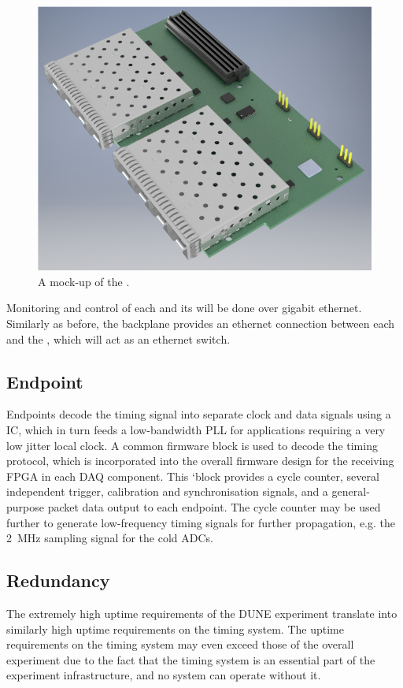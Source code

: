 \documentclass{article}
\begin{document}
\begin{figure}[h]
\includegraphics[width=\textwidth]{fib_mockup.png}
\caption{A mock-up of the .}
\label{fig:fib_mockup}
\end{figure}

Monitoring and control of each  and its  will be done over gigabit ethernet. Similarly as before, the  backplane provides an ethernet connection between each  and the , which will act as an ethernet switch.

\subsection{Endpoint}
Endpoints decode the timing signal into separate clock and data
signals using a  IC, which in turn feeds a low-bandwidth PLL for applications requiring a very low jitter local clock. A common firmware block is used to decode the timing protocol, which is incorporated into the overall
firmware design for the receiving FPGA in each DAQ component. This
`block provides a cycle counter, several independent trigger, calibration and 
synchronisation signals, and a general-purpose packet data output to each endpoint. The cycle counter may be used further to generate low-frequency timing signals for further propagation, e.g. the \SI{2}{\MHz} sampling signal for the cold ADCs.
\subsection{Redundancy}
The extremely high uptime requirements of the DUNE experiment translate into similarly high uptime requirements on the timing system. The uptime requirements on the timing system may even exceed those of the overall experiment due to the fact that the timing system is an essential part of the experiment infrastructure, and no system can operate without it.
\end{document}
